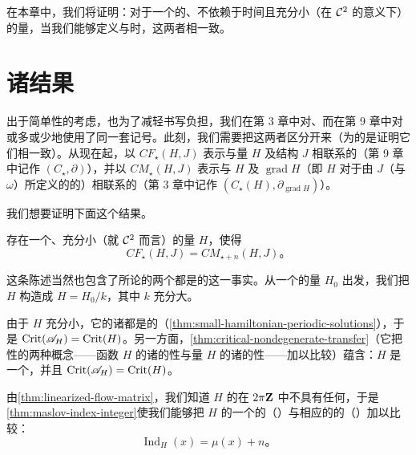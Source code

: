 
在本章中，我们将证明：对于一个\trNondegenerate{}的、不依赖于时间且充分小（在 $\mathcal{C}^{2}$ \trTopology{}的意义下）的\trHamiltonian{}量，当我们能够定义\trMorseComplex{}与\trFloerComplex{}时，这两者相一致。

\section{诸结果}
\label{sec:floer-to-morse-results}

出于简单性的考虑，也为了减轻书写负担，我们在第 3 章中对\trMorseComplex、而在第 9 章中对\trFloerComplex{}或多或少地使用了同一套记号。此刻，我们需要把这两者区分开来（为的是证明它们相一致）。从现在起，以 $CF_{\star}(H,J)$ 表示与\trHamiltonian{}量 $H$ 及\trAlmostComplex{}结构 $J$ 相联系的\trFloerComplex（第 9 章中记作 $(C_{\star},\partial)$），并以 $CM_{\star}(H,J)$ 表示与\trMorseFunction{} $H$ 及\trVectorField{} $\operatorname{grad}H$（即 $H$ 对于由 $J$（与 $\omega$）所定义的\trMetric{}的\trGradient）相联系的\trMorseComplex（第 3 章中记作 $(C_{\star}(H),\partial_{\operatorname{grad}H})$）。

我们想要证明下面这个结果。

\begin{theorem}\label{thm:floer-equals-morse-complex}
存在一个\trNondegenerate、充分小（就 $\mathcal{C}^{2}$ \trTopology{}而言）的\trHamiltonian{}量 $H$，使得
\[ CF_{\star}(H,J)=CM_{\star+n}(H,J)\text{。} \]
\end{theorem}

这条陈述当然也包含了所论的两个\trComplex{}都是\trWellDefined{}的这一事实。从一个\trNondegenerate{}的\trHamiltonian{}量 $H_{0}$ 出发，我们把 $H$ 构造成 $H=H_{0}/k$，其中 $k$ 充分大。

由于 $H$ 充分小，它的诸\trPeriodic\trTrajectory{}都是\trStationary{}的（\cref{thm:small-hamiltonian-periodic-solutions}），于是 $\operatorname{Crit}(\mathscr{A}_{H})=\operatorname{Crit}(H)$。另一方面，\cref{thm:critical-nondegenerate-transfer}（它把\trNondegenerate{}性的两种概念——函数 $H$ 的诸\trCriticalPoint{}的\trNondegenerate{}性与\trHamiltonian{}量 $H$ 的诸\trPeriodic\trTrajectory{}的\trNondegenerate{}性——加以比较）蕴含：$H$ 是一个\trMorseFunction，并且 $\operatorname{Crit}(\mathscr{A}_{H})=\operatorname{Crit}(H)$。

由\cref{thm:linearized-flow-matrix}，我们知道 $H$ 的\trHessian{}在 $2\pi\mathbf{Z}$ 中不具有任何\trEigenvalue，于是\cref{thm:maslov-index-integer}使我们能够把 $H$ 的一个\trCriticalPoint{}的（\trMorse）\trIndex{}与相应的\trStationary\trTrajectory{}的（\trMaslov）\trIndex{}加以比较：
\[ \operatorname{Ind}_{H}(x)=\mu(x)+n\text{。} \]

